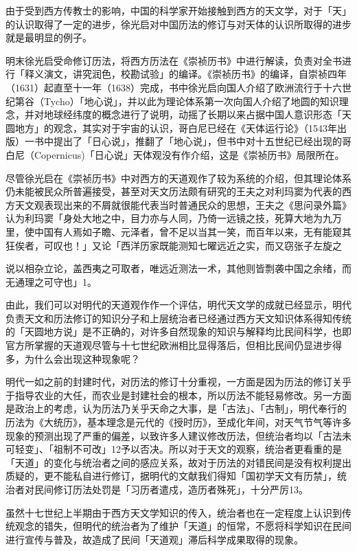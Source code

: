 由于受到西方传教士的影响，中国的科学家开始接触到西方的天文学，对于「天」的认识取得了一定的进步，徐光启对中国历法的修订与对天体的认识所取得的进步就是最明显的例子。

明末徐光启受命修订历法，将西方历法在《崇祯历书》中进行解读，负责对全书进行「释义演文，讲究润色，校勘试验」的编译。《崇祯历书》的编译，自崇祯四年（1631）起直至十一年（1638）完成，书中徐光启向国人介绍了欧洲流行于十六世纪第谷（Tycho）「地心说」，并以此为理论体系第一次向国人介绍了地圆的知识理念，并对地球经纬度的概念进行了说明，动摇了长期以来占据中国人意识形态「天圆地方」的观念，其实对于宇宙的认识，哥白尼已经在《天体运行论》（1543年出版）一书中提出了「日心说」，推翻了「地心说」，但书中对十五世纪已经出现的哥白尼（Copernicus)「日心说」天体观没有作介绍，这是《崇祯历书》局限所在。

尽管徐光启在《崇祯历书》中对西方的天道观作了较为系统的介绍，但其理论体系仍未能被民众所普遍接受，甚至对天文历法颇有研究的王夫之对利玛窦为代表的西方天文观表现出来的不屑就很能代表当时普通民众的思想，王夫之《思问录外篇》认为利玛窦「身处大地之中，目力亦与人同，乃倚一远镜之技，死算大地为九万里，使中国有人焉如子瞻、元泽者，曾不足以当其一笑，而百年以来，无有能窥其狂俟者，可叹也！」又论「西洋历家既能测知七曜远近之实，而又窃张子左旋之


\noindent 说以相杂立论，盖西夷之可取者，唯远近测法一术，其他则皆剽袭中国之余绪，而无通理之可守也」1。

由此，我们可以对明代的天道观作作一个评估，明代天文学的成就已经显示，明代负责天文和历法修订的知识分子和上层统治者已经通过西方天文知识体系得知传统的「天圆地方说」是不正确的，对许多自然现象的知识与解释均比民间科学，也即官方所掌握的天道观尽管与十七世纪欧洲相比显得落后，但相比民间仍显进步得多，为什么会出现这种现象呢？

明代一如之前的封建时代，对历法的修订十分重视，一方面是因为历法的修订关乎于指导农业的大任，而农业是封建社会的根本，所以历法不能轻易修改。另一方面是政治上的考虑，认为历法乃关乎天命之大事，是「古法」、「古制」，明代奉行的历法为《大统历》，基本理念是元代的《授时历》，至成化年间，对天气节气等许多现象的预测出现了严重的偏差，以致许多人建议修改历法，但统治者均以「古法未可轻变」、「祖制不可改」12予以否决。所以对于天文的观察，统治者更看重的是「天道」的变化与统治者之间的感应关系，故对于历法的对错民间是没有权利提出质疑的，更不能私自进行修订，据明代的文献我们得知「国初学天文有历禁」，统治者对民间修订历法处罚是「习历者遣戍，造历者殊死」，十分严厉13。

虽然十七世纪上半期由于西方天文学知识的传入，统治者也在一定程度上认识到传统观念的错失，但明代的统治者为了维护「天道」的恒常，不愿将科学知识在民间进行宣传与普及，故造成了民间「天道观」滞后科学成果取得的现象。

